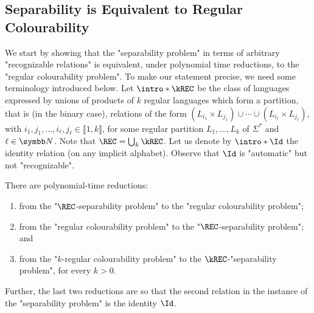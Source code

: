 \subsection{Separability is Equivalent to Regular Colourability}

We start by showing that the "separability problem" in terms of arbitrary "recognizable relations" is equivalent, under polynomial time reductions, 
to the "regular colourability problem". To make our statement precise, we need some terminology introduced below. 
\AP
Let $\intro*\kREC$ be the class of languages expressed by unions of products of $k$ regular languages which form a partition, that is (in the binary case), relations of the form $(L_{i_1} \times L_{j_1}) \cup \dotsb \cup (L_{i_\ell} \times L_{j_\ell})$, with $i_1,j_1,\hdots,i_\ell, j_\ell \in \lBrack 1,k \rBrack$, for some regular partition $L_1, \dotsc, L_{k}$ of $\Sigma^*$ and $\ell \in \N$.
\AP
Note that $\REC = \bigcup_k \kREC$.
\AP%
Let us denote by $\intro*\Id$ the identity relation (on any implicit alphabet). Observe that $\Id$ is "automatic" but not "recognizable".

\begin{theorem}
    \AP\label{thm:reg-colourability-equiv-separability}
    There are polynomial-time reductions: 
    \begin{enumerate}
        \item from the "$\REC$-separability problem" to the "regular colourability problem"; 
        \item from the "regular colourability problem" to the "$\REC$-separability problem"; and
        \item from the "$k$-regular colourability problem" to the $\kREC$-"separability problem", for every $k > 0$.
    \end{enumerate}
    Further, the last two reductions are so that the second relation in the instance of the "separability problem" is the identity $\Id$.
\end{theorem}
   
